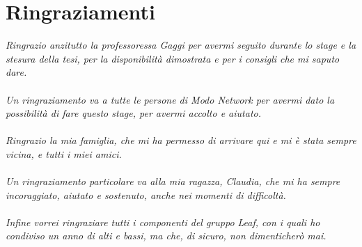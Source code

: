 \section*{Ringraziamenti}
\textit{Ringrazio anzitutto la professoressa Gaggi per avermi seguito durante lo stage e la stesura della tesi, per la disponibilità dimostrata e per i consigli che mi saputo dare. \\\\
Un ringraziamento va a tutte le persone di Modo Network per avermi dato la possibilità di fare questo stage, per avermi accolto e aiutato.\\\\
Ringrazio la mia famiglia, che mi ha permesso di arrivare qui e mi è stata sempre vicina, e tutti i miei amici.\\\\
Un ringraziamento particolare va alla mia ragazza, Claudia, che mi ha sempre incoraggiato, aiutato e sostenuto, anche nei momenti di difficoltà.\\\\
Infine vorrei ringraziare tutti i componenti del gruppo Leaf, con i quali ho condiviso un anno di alti e bassi, ma che, di sicuro, non dimenticherò mai.}